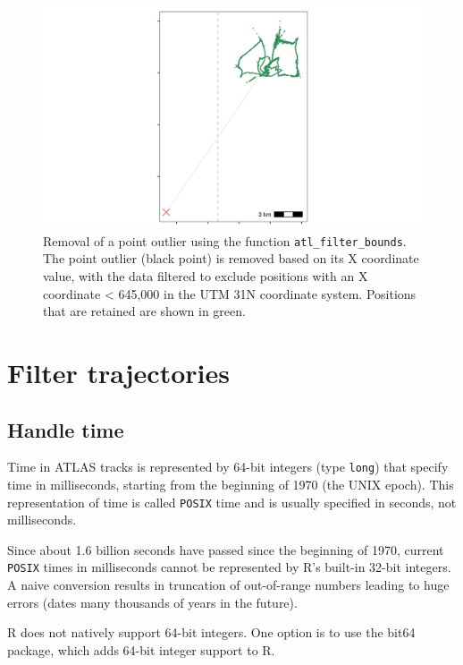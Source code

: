 \documentclass[]{scrreprt}
\begin{document}
\begin{figure}
\centering
\includegraphics{figures/fig_calib_bbox.png}
\caption{Removal of a point outlier using the function \texttt{atl\_filter\_bounds}. The point outlier (black point) is removed based on its X coordinate value, with the data filtered to exclude positions with an X coordinate \textless{} 645,000 in the UTM 31N coordinate system. Positions that are retained are shown in green.}
\end{figure}

\hypertarget{filter-trajectories}{%
\section{Filter trajectories}\label{filter-trajectories}}

\hypertarget{handle-time}{%
\subsection{Handle time}\label{handle-time}}

Time in ATLAS tracks is represented by 64-bit integers (type \texttt{long}) that specify time in milliseconds, starting from the beginning of 1970 (the UNIX epoch). This representation of time is called \texttt{POSIX} time and is usually specified in seconds, not milliseconds.

Since about 1.6 billion seconds have passed since the beginning of 1970, current \texttt{POSIX} times in milliseconds cannot be represented by R's built-in 32-bit integers. A naive conversion results in truncation of out-of-range numbers leading to huge errors (dates many thousands of years in the future).

R does not natively support 64-bit integers. One option is to use the bit64 package, which adds 64-bit integer support to R.
\end{document}
